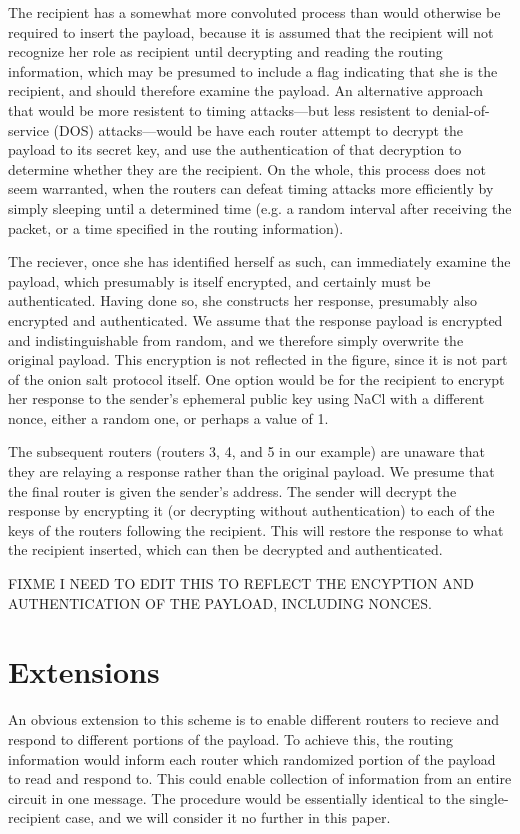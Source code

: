 \documentclass[letterpaper,twocolumn,amsmath,amssymb,pre,aps,10pt]{revtex4-1}
\begin{document}
The recipient has a somewhat more convoluted process than would
otherwise be required to insert the payload, because it is assumed
that the recipient will not recognize her role as recipient until
decrypting and reading the routing information, which may be presumed
to include a flag indicating that she is the recipient, and should
therefore examine the payload.  An alternative approach that would be
more resistent to timing attacks---but less resistent to
denial-of-service (DOS) attacks---would be have each router attempt to
decrypt the payload to its secret key, and use the authentication of
that decryption to determine whether they are the recipient.  On the
whole, this process does not seem warranted, when the routers can
defeat timing attacks more efficiently by simply sleeping until a
determined time (e.g. a random interval after receiving the packet, or
a time specified in the routing information).

The reciever, once she has identified herself as such, can immediately
examine the payload, which presumably is itself encrypted, and
certainly must be authenticated.  Having done so, she constructs her
response, presumably also encrypted and authenticated.  We assume that
the response payload is encrypted and indistinguishable from random,
and we therefore simply overwrite the original payload.  This
encryption is not reflected in the figure, since it is not part of the
onion salt protocol itself.  One option would be for the recipient to
encrypt her response to the sender's ephemeral public key using NaCl
with a different nonce, either a random one, or perhaps a value of 1.

The subsequent routers (routers 3, 4, and 5 in our example) are
unaware that they are relaying a response rather than the original
payload.  We presume that the final router is given the sender's
address.  The sender will decrypt the response by encrypting it (or
decrypting without authentication) to each of the keys of the routers
following the recipient.  This will restore the response to what the
recipient inserted, which can then be decrypted and authenticated.

FIXME I NEED TO EDIT THIS TO REFLECT THE ENCYPTION AND AUTHENTICATION
OF THE PAYLOAD, INCLUDING NONCES.

\section{Extensions}

An obvious extension to this scheme is to enable different routers to
recieve and respond to different portions of the payload.  To achieve
this, the routing information would inform each router which
randomized portion of the payload to read and respond to. This could
enable collection of information from an entire circuit in one
message.  The procedure would be essentially identical to the
single-recipient case, and we will consider it no further in this
paper.
\end{document}
